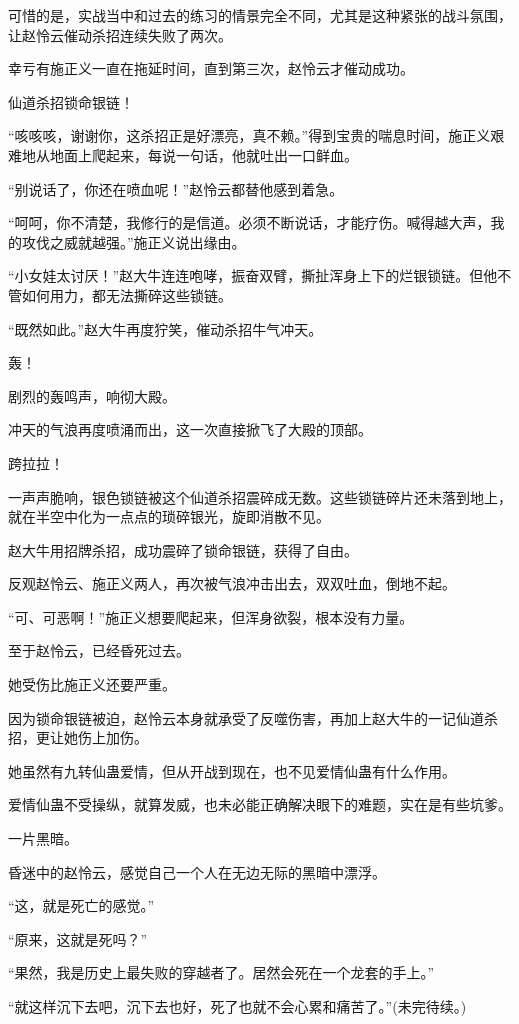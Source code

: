 \begin{this_body}
可惜的是，实战当中和过去的练习的情景完全不同，尤其是这种紧张的战斗氛围，让赵怜云催动杀招连续失败了两次。

幸亏有施正义一直在拖延时间，直到第三次，赵怜云才催动成功。

仙道杀招锁命银链！

“咳咳咳，谢谢你，这杀招正是好漂亮，真不赖。”得到宝贵的喘息时间，施正义艰难地从地面上爬起来，每说一句话，他就吐出一口鲜血。

“别说话了，你还在喷血呢！”赵怜云都替他感到着急。

“呵呵，你不清楚，我修行的是信道。必须不断说话，才能疗伤。喊得越大声，我的攻伐之威就越强。”施正义说出缘由。

“小女娃太讨厌！”赵大牛连连咆哮，振奋双臂，撕扯浑身上下的烂银锁链。但他不管如何用力，都无法撕碎这些锁链。

“既然如此。”赵大牛再度狞笑，催动杀招牛气冲天。

轰！

剧烈的轰鸣声，响彻大殿。

冲天的气浪再度喷涌而出，这一次直接掀飞了大殿的顶部。

跨拉拉！

一声声脆响，银色锁链被这个仙道杀招震碎成无数。这些锁链碎片还未落到地上，就在半空中化为一点点的琐碎银光，旋即消散不见。

赵大牛用招牌杀招，成功震碎了锁命银链，获得了自由。

反观赵怜云、施正义两人，再次被气浪冲击出去，双双吐血，倒地不起。

“可、可恶啊！”施正义想要爬起来，但浑身欲裂，根本没有力量。

至于赵怜云，已经昏死过去。

她受伤比施正义还要严重。

因为锁命银链被迫，赵怜云本身就承受了反噬伤害，再加上赵大牛的一记仙道杀招，更让她伤上加伤。

她虽然有九转仙蛊爱情，但从开战到现在，也不见爱情仙蛊有什么作用。

爱情仙蛊不受操纵，就算发威，也未必能正确解决眼下的难题，实在是有些坑爹。

一片黑暗。

昏迷中的赵怜云，感觉自己一个人在无边无际的黑暗中漂浮。

“这，就是死亡的感觉。”

“原来，这就是死吗？”

“果然，我是历史上最失败的穿越者了。居然会死在一个龙套的手上。”

“就这样沉下去吧，沉下去也好，死了也就不会心累和痛苦了。”(未完待续。)

\end{this_body}

